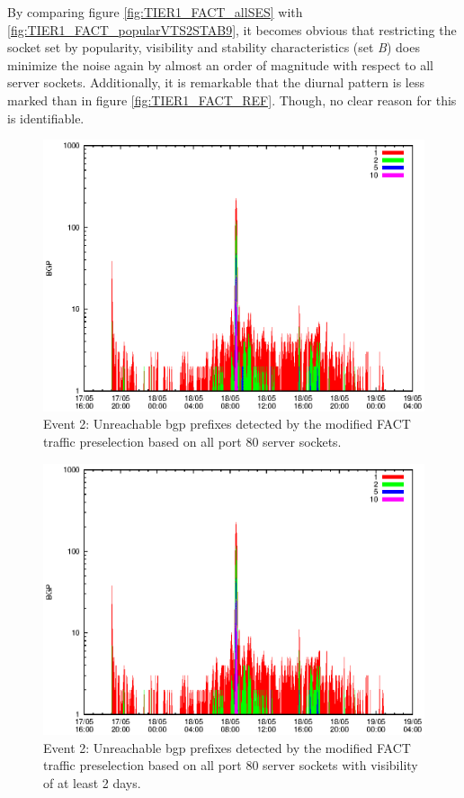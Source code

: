 By comparing figure \ref{fig:TIER1_FACT_allSES} with \ref{fig:TIER1_FACT_popularVTS2STAB9}, it becomes obvious that restricting the socket set by popularity, visibility and stability characteristics (set \emph{B}) does minimize the noise again by almost an order of magnitude with respect to all \glspl{server socket}. 
Additionally, it is remarkable that the diurnal pattern is less marked than in figure \ref{fig:TIER1_FACT_REF}. 
Though, no clear reason for this is identifiable. 
\begin{figure}
	[p] \centering 
	\includegraphics[width=0.75\linewidth]{images/events/2010_05_18/bgp_log_allPort80SES.eps} \caption{Event 2: Unreachable \gls{bgp} prefixes detected by the modified \gls{FACT} traffic preselection based on all port 80 \glspl{server socket}.} 
	\label{fig:TIER1_FACT_allSES80} 
\end{figure}
\begin{figure}
	[p] \centering 
	\includegraphics[width=0.75\linewidth]{images/events/2010_05_18/bgp_log_port80_Set_stab_0_vts_2.eps} \caption{Event 2: Unreachable \gls{bgp} prefixes detected by the modified \gls{FACT} traffic preselection based on all port 80 \glspl{server socket} with visibility of at least 2 days.} 
	\label{fig:TIER1_FACT_allSES80VTS2} 
\end{figure}
